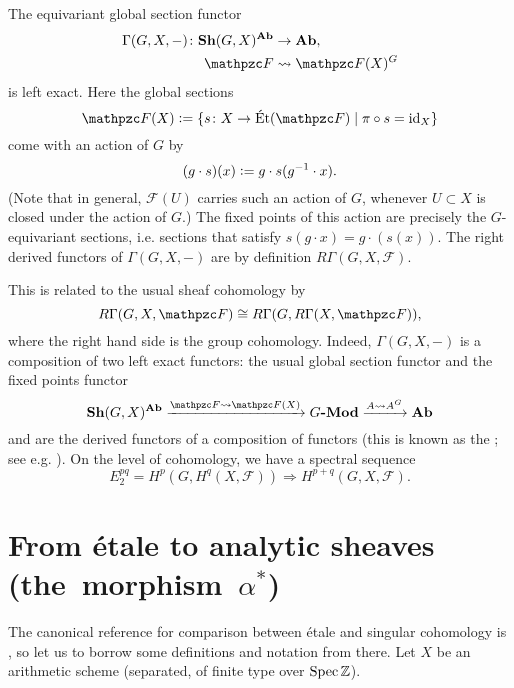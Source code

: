 \begin{definition}
  The equivariant global section functor
  \begin{align*}
    \Gamma (G,X,-)\colon \categ{Sh} (G,X)^\categ{Ab} & \to \categ{Ab},\\
    \mathcal{F} & \rightsquigarrow \mathcal{F} (X)^G
  \end{align*}
  is left exact. Here the global sections
  \[ \mathcal{F} (X) \dfn
    \{ s\colon X\to \Et (\mathcal{F}) \mid \pi\circ s = \id{X} \} \]
  come with an action of $G$ by
  $$(g\cdot s) (x) \mathrel{\mathop:}= g\cdot s (g^{-1}\cdot x).$$
  (Note that in general, $\mathcal{F} (U)$ carries such an action of $G$,
  whenever $U \subset X$ is closed under the action of $G$.) The fixed points of
  this action are precisely the $G$-equivariant sections, i.e. sections that
  satisfy $s (g\cdot x) = g\cdot (s (x))$. The right derived functors of
  $\Gamma (G,X,-)$ are by definition $R\Gamma (G, X, \mathcal{F})$.
\end{definition}

This is related to the usual sheaf cohomology by
\begin{equation}
  \label{eqn:grothendieck-ss-for-equivariant-sheaves}
  R\Gamma (G, X, \mathcal{F}) \isom R\Gamma (G, R\Gamma (X, \mathcal{F})),
\end{equation}
where the right hand side is the group cohomology. Indeed, $\Gamma (G,X,-)$ is a
composition of two left exact functors: the usual global section functor and the
fixed points functor
\[ \categ{Sh} (G,X)^\categ{Ab}
  \xrightarrow{\mathcal{F} \rightsquigarrow \mathcal{F} (X)}
  G\categ{-Mod} \xrightarrow{A \rightsquigarrow A^G} \categ{Ab} \]
and  are the derived
functors of a composition of functors (this is known as the
; see e.g. \cite[\S 10.8]{Weibel-94}). On
the level of cohomology, we have a spectral sequence
\[ E_2^{pq} = H^p (G, H^q (X,\mathcal{F})) \Longrightarrow
  H^{p+q} (G,X,\mathcal{F}). \]


\section{From étale to analytic sheaves
  \mbox{(the morphism \texorpdfstring{$\alpha^*$}{α\^{}∗})}}
\label{section:etale-and-equivariant-sheaves}

The canonical reference for comparison between étale and singular cohomology is
\cite[Exposé~XI, \S 4]{SGA4}, so let us to borrow some definitions and notation
from there. Let $X$ be an arithmetic scheme (separated, of finite type over
$\operatorname{Spec} \mathbb{Z}$).

